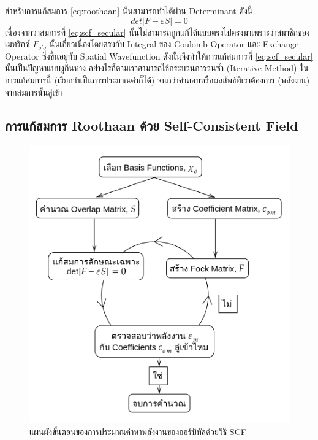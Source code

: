 สำหรับการแก้สมการ \eqref{eq:roothaan} นั้นสามารถทำได้ผ่าน Determinant ดังนี้
%
\begin{equation}\label{eq:scf_secular}
    det|F - \varepsilon S| = 0
\end{equation}
%
\noindent เนื่องจากว่าสมการที่ \eqref{eq:scf_secular} นั้นไม่สามารถถูกแก้ได้แบบตรงไปตรงมาเพราะว่าสมาชิกของเมทริกซ์ $F_{o'o}$ นั้นเกี่ยวเนื่องโดยตรงกับ Integral ของ Coulomb Operator และ Exchange Operator ซึ่งขึ้นอยู่กับ Spatial Wavefunction ดังนั้นจึงทำให้การแก้สมการที่ \eqref{eq:scf_secular} นั้นเป็นปัญหาแบบงูกินหาง อย่างไรก็ตามเราสามารถใช้กระบวนการวนซ้ำ (Iterative Method) ในการแก้สมการนี้ (เรียกว่าเป็นการประมาณค่าก็ได้) จนกว่าคำตอบหรือผลลัพธ์ที่เราต้องการ (พลังงาน) จากสมการนั้นลู่เข้า

\subsection{การแก้สมการ Roothaan ด้วย Self-Consistent Field}
\label{ssec:roothaan_scf}

\begin{figure}[H]
    \centering
    \includegraphics[width=0.7\linewidth]{fig/scf.png}
    \caption{แผนผังขั้นตอนของการประมาณค่าหาพลังงานของออร์บิทัลด้วยวิธี SCF}
    \label{fig:scf}
\end{figure}

